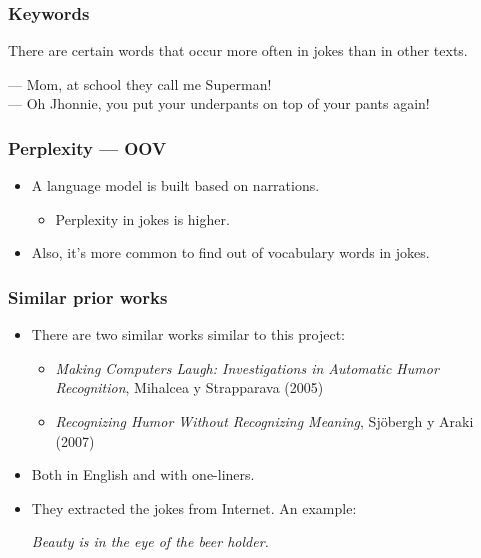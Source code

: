 \begin{frame}
    \frametitle{Keywords}

    There are certain words that occur more often in jokes than in other texts.

    \begin{example}
        --- Mom, at school they call me Superman! \\
        --- Oh Jhonnie, you put your underpants on top of your pants again!
    \end{example}
\end{frame}

\begin{frame}
    \frametitle{Perplexity --- OOV}

    \begin{itemize}
        \item A language model is built based on narrations.

        \begin{itemize}
            \item Perplexity in jokes is higher.
        \end{itemize}

        \item Also, it's more common to find out of vocabulary words in jokes.
    \end{itemize}
\end{frame}

\begin{frame}
    \frametitle{Similar prior works}

    \begin{itemize}
        \item There are two similar works similar to this project:

        \begin{itemize}
            \item \emph{Making Computers Laugh: Investigations in Automatic Humor Recognition}, Mihalcea y Strapparava (2005)
            \item \emph{Recognizing Humor Without Recognizing Meaning}, Sjöbergh y Araki (2007)
        \end{itemize}

        \item Both in English and with one-liners.

        \item They extracted the jokes from Internet. An example:

        \begin{center}
            \emph{Beauty is in the eye of the beer holder.}
        \end{center}
    \end{itemize}
\end{frame}

